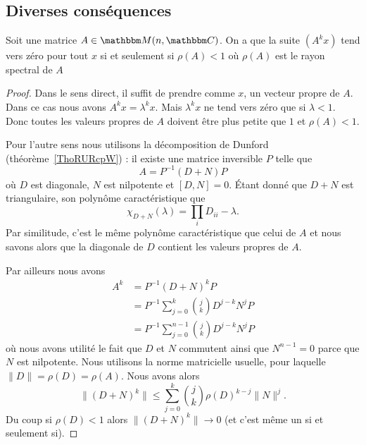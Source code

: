 \subsection{Diverses conséquences}

\begin{theorem}
    Soit une matrice \( A\in \eM(n,\eC)\). On a que la suite \( (A^kx)\) tend vers zéro pour tout \( x\) si et seulement si \( \rho(A)<1\) où \( \rho(A)\) est le rayon spectral de $A$
\end{theorem}

\begin{proof}
    Dans le sens direct, il suffit de prendre comme \( x\), un vecteur propre de \( A\). Dans ce cas nous avons \( A^kx=\lambda^kx\). Mais \( \lambda^kx\) ne tend vers zéro que si \( \lambda<1\). Donc toutes les valeurs propres de \( A\) doivent être plus petite que \( 1\) et \( \rho(A)<1\).

    Pour l'autre sens nous utilisons la décomposition de Dunford (théorème~\ref{ThoRURcpW}) : il existe une matrice inversible \( P\) telle que
    \begin{equation}
        A=P^{-1}(D+N)P
    \end{equation}
    où \( D\) est diagonale, \( N\) est nilpotente et \( [D,N]=0\). Étant donné que \( D+N\) est triangulaire, son polynôme caractéristique que
    \begin{equation}
        \chi_{D+N}(\lambda)=\prod_i D_{ii}-\lambda.
    \end{equation}
    Par similitude, c'est le même polynôme caractéristique que celui de \( A\) et nous savons alors que la diagonale de \( D\) contient les valeurs propres de \( A\).

    Par ailleurs nous avons
    \begin{subequations}
        \begin{align}
            A^k&=P^{-1}(D+N)^kP\\
            &=P^{-1}\sum_{j=0}^k{j\choose k}D^{j-k}N^jP\\
            &=P^{-1}\sum_{j=0}^{n-1}{j\choose k}D^{j-k}N^jP
        \end{align}
    \end{subequations}
    où nous avons utilité le fait que \( D\) et \( N\) commutent ainsi que \( N^{n-1}=0\) parce que \( N\) est nilpotente. Nous utilisons la norme matricielle usuelle, pour laquelle \( \| D \|=\rho(D)=\rho(A)\). Nous avons alors
    \begin{equation}
        \| (D+N)^k \|\leq \sum_{j=0}^k{j\choose k}\rho(D)^{k-j}\| N \|^j.
    \end{equation}
    Du coup si \( \rho(D)<1\) alors \( \| (D+N)^k \|\to 0\) (et c'est même un si et seulement si).
\end{proof}

